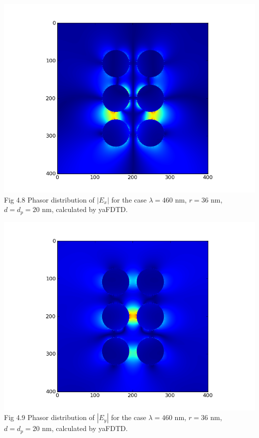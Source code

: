 \documentclass[openany]{book}
\begin{document}
\begin{center}
\includegraphics[scale=0.8]{images/ex.png}\\
Fig 4.8
Phasor distribution of $|E_x|$ for the case $\lambda = 460$ nm, $r = 36$ nm, $d = d_p = 20$ nm, calculated by yaFDTD.
\end{center}

\begin{center}
\includegraphics[scale=0.8]{images/ey.png}\\
Fig 4.9
Phasor distribution of $|E_y|$ for the case $\lambda = 460$ nm, $r = 36$ nm, $d = d_p = 20$ nm, calculated by yaFDTD.
\end{center}
\end{document}
